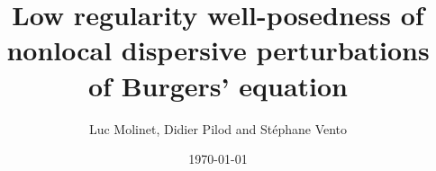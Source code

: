 \documentclass{amsart}
\theoremstyle{definition}
\theoremstyle{remark}
\numberwithin{equation}{section}
\begin{document}
\title[Well-posedness for dispersive Burgers equation]{Low regularity well-posedness of nonlocal dispersive perturbations of Burgers' equation}

\author[L. Molinet, D. Pilod and S. Vento]{Luc Molinet, Didier Pilod  and St\'ephane Vento}

\address{Luc Molinet,  Institut Denis Poisson, Universit\'e de Tours, Universit\'e d'Orl\'eans, CNRS (UMR 7013), Parc Grandmont, 37200 Tours, France.}

\address{Didier Pilod, Department of Mathematics, University of Bergen, PO Box 7803, 5020 Bergen, Norway. }

\address{St\'ephane Vento, Universit\'e Sorbonne Paris Nord, Laboratoire Analyse, G\'eom\'etrie et Applications, LAGA, CNRS, UMR 7539, F-93430, Villetaneuse, France.}

\date{\today}

\maketitle
\end{document}
